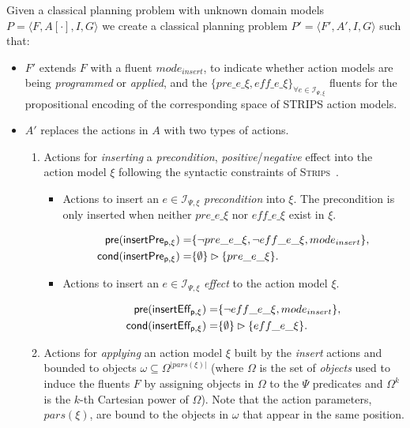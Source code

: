 \documentclass[letterpaper]{article} %
\newcommand{\tup}[1]{{\langle #1 \rangle}}
\newcommand{\pre}{\mathsf{pre}}     %
\newcommand{\cond}{\mathsf{cond}}   %
\newcommand{\strips}{\textsc{Strips}}     %
\begin{document}
Given a classical planning problem with unknown domain models $P=\tup{F,A[\cdot],I,G}$ we create a classical planning problem $P'=\tup{F',A',I,G}$ such that:
\begin{itemize}
\item $F'$ extends $F$ with a fluent $mode_{insert}$, to indicate whether action models are being {\em programmed} or {\em applied}, and the $\{pre\_e\_\xi, eff\_e\_\xi\}_{\forall e\in{\mathcal I}_{\Psi,\xi}}$ fluents for the propositional encoding of the corresponding space of STRIPS action models. 

\item $A'$ replaces the actions in $A$ with two types of actions.
\begin{enumerate}
\item Actions for {\em inserting} a {\em precondition}, {\em positive}/{\em negative} effect into the action model $\xi$ following the syntactic constraints of \strips\ . 
\begin{itemize}
\item Actions to insert an $e\in{\mathcal I}_{\Psi,\xi}$ {\em precondition} into $\xi$. The precondition is only inserted when neither $pre\_e\_\xi$ nor $eff\_e\_\xi$ exist in $\xi$.

\begin{small}
\begin{align*}
\hspace*{7pt}\pre(\mathsf{insertPre_{p,\xi}})=&\{\neg pre\_e\_\xi, \neg eff\_e\_\xi, mode_{insert}\},\\
\cond(\mathsf{insertPre_{p,\xi}})=&\{\emptyset\}\rhd\{pre\_e\_\xi\}.
\end{align*}
\end{small}

\item Actions to insert an $e\in{\mathcal I}_{\Psi,\xi}$ {\em effect} to the action model $\xi$. 

\begin{small}
\begin{align*}
\hspace*{7pt}\pre(\mathsf{insertEff_{p,\xi}})=&\{\neg eff\_e\_\xi, mode_{insert}\},\\
\cond(\mathsf{insertEff_{p,\xi}})=&\{\emptyset\}\rhd\{eff\_e\_\xi\}.
\end{align*}
\end{small}
\end{itemize}

\item Actions for {\em applying} an action model $\xi$ built by the {\em insert} actions and bounded to objects $\omega\subseteq\Omega^{|pars(\xi)|}$ (where $\Omega$ is the set of {\em objects} used to induce the fluents $F$ by assigning objects in $\Omega$ to the $\Psi$ predicates and $\Omega^k$ is the $k$-th Cartesian power of $\Omega$). Note that the action parameters, $pars(\xi)$, are bound to the objects in $\omega$ that appear in the same position.
\end{enumerate}
\end{itemize}
\end{document}
